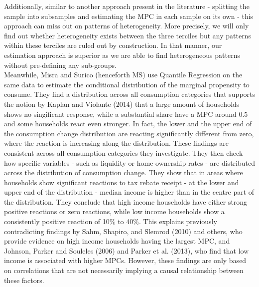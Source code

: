 Additionally, similar to another approach present in the literature - splitting the sample into subsamples and estimating the MPC in each sample on its own - this approach can miss out on patterns of heterogeneity. More precisely, we will only find out whether heterogeneity exists between the three terciles but any patterns within these terciles are ruled out by construction. In that manner, our estimation approach is superior as we are able to find heterogeneous patterns without pre-defining any sub-groups. \\
Meanwhile, Misra and Surico (henceforth MS) use Quantile Regression on the same data to estimate the conditional distribution of the marginal propensity to consume. They find a distribution across all consumption categories that supports the notion by Kaplan and Violante (2014) that a large amount of households shows no singificant response, while a substantial share have a MPC around 0.5 and some households react even stronger. In fact, the lower and the upper end of the consumption change distribution are reacting significantly different from zero, where the reaction is increasing along the distribution. These findings are consistent across all consumption categories they investigate. They then check how specific variables - such as liquidity or home-ownership rates - are distributed across the distribution of consumption change. They show that in areas where households show significant reactions to tax rebate receipt - at the lower and upper end of the distribution - median income is higher than in the centre part of the distribution. They conclude that high income households have either strong positive reactions or zero reactions, while low income households show a consistently positive reaction of 10\% to 40\%. This explains previously contradicting findings by Sahm, Shapiro, and Slemrod (2010) and others, who provide evidence on high income households having the largest MPC, and Johnson, Parker and Souleles (2006) and Parker et al. (2013), who find that low income is associated with higher MPCs. However, these findings are only based on correlations that are not necessarily implying a causal relationship between these factors. \\ 

